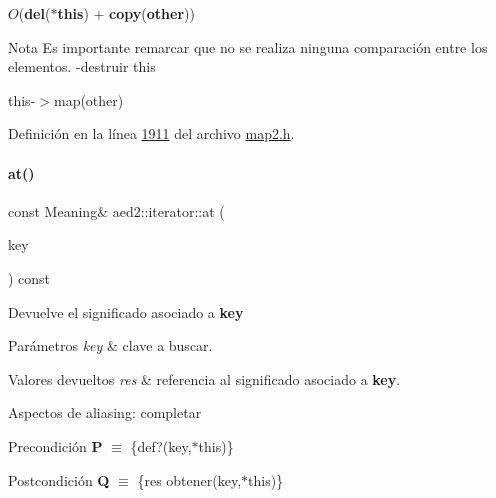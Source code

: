 \begin{DoxyDescription}
\item[Complejidad Temporal]$O$({\bfseries del}({\bfseries $\ast$this}) $+$ {\bfseries copy}({\bfseries other}))
\end{DoxyDescription}

\begin{DoxyNote}{Nota}
Es importante remarcar que no se realiza ninguna comparación entre los elementos. -\/destruir this
\begin{DoxyItemize}
\item this-\/$>$map(other) 
\end{DoxyItemize}
\end{DoxyNote}


Definición en la línea \hyperlink{map2_8h_source_l01911}{1911} del archivo \hyperlink{map2_8h_source}{map2.\+h}.

\mbox{\label{classaed2_1_1iterator_a5a443b1a5d288b9512a6698b92cb415d_a5a443b1a5d288b9512a6698b92cb415d}} 
\paragraph{\texorpdfstring{at()}{at()}\hspace{0.1cm}{\footnotesize\ttfamily [1/2]}}
{\footnotesize\ttfamily const Meaning\& aed2\+::iterator\+::at (\begin{DoxyParamCaption}\item[{const Key \&}]{key }\end{DoxyParamCaption}) const\hspace{0.3cm}{\ttfamily [inline]}}



Devuelve el significado asociado a {\bfseries key} 


\begin{DoxyParams}{Parámetros}
{\em key} & clave a buscar. \\
\hline
\end{DoxyParams}

\begin{DoxyRetVals}{Valores devueltos}
{\em res} & referencia al significado asociado a {\bfseries key}.\\
\hline
\end{DoxyRetVals}
\begin{DoxyParagraph}{Aspectos de aliasing\+:}
completar
\end{DoxyParagraph}
\begin{DoxyPrecond}{Precondición}
{\bfseries P} $\equiv$ \{def?(key,$\ast$this)\}
\end{DoxyPrecond}
\begin{DoxyPostcond}{Postcondición}
{\bfseries Q} $\equiv$ \{res  obtener(key,$\ast$this)\}
\end{DoxyPostcond}


